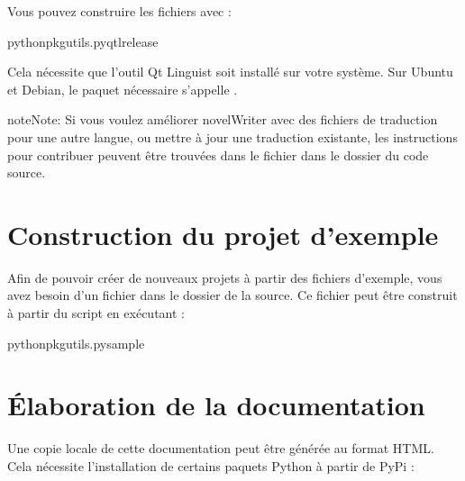 \documentclass[a4paper,11pt,french]{sphinxmanual}
\begin{document}
\sphinxAtStartPar
Vous pouvez construire les fichiers  avec :

\begin{sphinxVerbatim}[commandchars=\\\{\}]
pythonpkgutils.pyqtlrelease
\end{sphinxVerbatim}

\sphinxAtStartPar
Cela nécessite que l’outil Qt Linguist soit installé sur votre système. Sur Ubuntu et Debian, le paquet nécessaire s’appelle .

\begin{sphinxadmonition}{note}{Note:}
\sphinxAtStartPar
Si vous voulez améliorer novelWriter avec des fichiers de traduction pour une autre langue, ou mettre à jour une traduction existante, les instructions pour contribuer peuvent être trouvées dans le fichier  dans le dossier  du code source.
\end{sphinxadmonition}


\section{Construction du projet d’exemple}
\label{\detokenize{tech_source:building-the-example-project}}\label{\detokenize{tech_source:a-source-sample}}
\sphinxAtStartPar
Afin de pouvoir créer de nouveaux projets à partir des fichiers d’exemple, vous avez besoin d’un fichier  dans le dossier  de la source. Ce fichier peut être construit à partir du script  en exécutant :

\begin{sphinxVerbatim}[commandchars=\\\{\}]
pythonpkgutils.pysample
\end{sphinxVerbatim}


\section{Élaboration de la documentation}
\label{\detokenize{tech_source:building-the-documentation}}\label{\detokenize{tech_source:a-source-docs}}
\sphinxAtStartPar
Une copie locale de cette documentation peut être générée au format HTML. Cela nécessite l’installation de certains paquets Python à partir de PyPi :
\end{document}
